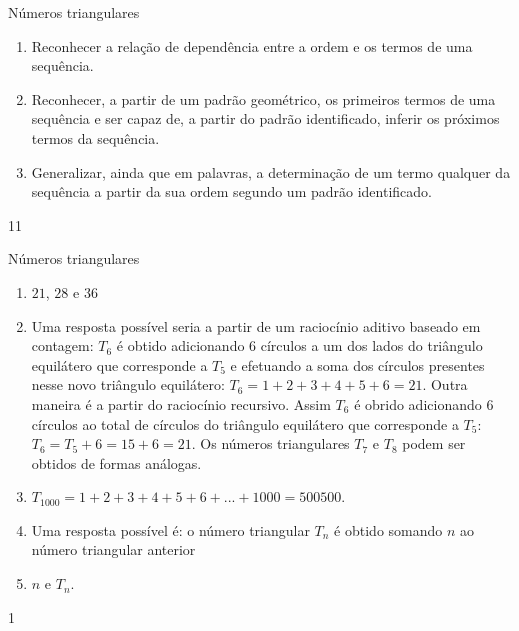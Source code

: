 \clearmargin
\begin{objectives}{Números triangulares}
{
\begin{enumerate}

\item Reconhecer a relação de dependência entre a ordem e os termos de uma sequência.

\item Reconhecer, a partir de um padrão geométrico, os primeiros termos de uma sequência e ser capaz de, a partir do padrão identificado, inferir os próximos termos da sequência.

\item Generalizar, ainda que em palavras, a determinação de um termo qualquer da sequência a partir da sua ordem segundo um padrão identificado.

\end{enumerate}
}{1}{1}
\end{objectives}
\begin{answer}{Números triangulares}
{
\begin{enumerate}
\item {} 
$21$, $28$ e $36$

\item {} 
Uma resposta possível seria a partir de um raciocínio aditivo baseado em contagem: $T_6$ é obtido adicionando $6$ círculos a um dos lados do triângulo equilátero que corresponde a $T_5$ e efetuando a soma dos círculos presentes nesse novo triângulo equilátero: $T_6=1+2+3+4+5+6=21$. Outra maneira é a partir do raciocínio recursivo. Assim $T_6$ é obrido adicionando $6$ círculos ao total de círculos do triângulo equilátero que corresponde a $T_5$: $T_6=T_5+6=15+6=21$. Os números triangulares $T_7$ e $T_8$ podem ser obtidos de formas análogas.

\item {} 
$T_1000=1+2+3+4+5+6+...+1000=500500$.

\item {} 
Uma resposta possível é: o número triangular $T_n$ é obtido somando $n$ ao número triangular anterior

\item {} 
$n$ e $T_n$.

\end{enumerate}
}{1}
\end{answer}
